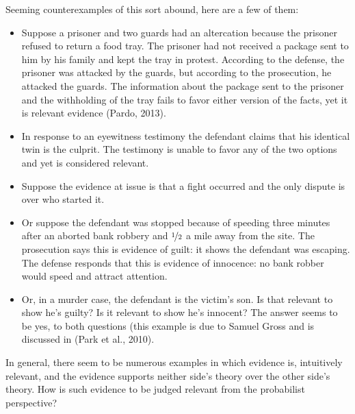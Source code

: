 \documentclass[10pt,dvipsnames,enabledeprecatedfontcommands]{scrartcl}
\begin{document}
\noindent  Seeming counterexamples of this sort abound, here are a few
of them:

\begin{itemize}
\item
  Suppose a prisoner and two guards had an altercation because the
  prisoner refused to return a food tray. The prisoner had not received
  a package sent to him by his family and kept the tray in protest.
  According to the defense, the prisoner was attacked by the guards, but
  according to the prosecution, he attacked the guards. The information
  about the package sent to the prisoner and the withholding of the tray
  fails to favor either version of the facts, yet it is relevant
  evidence (Pardo, 2013).
\item
  In response to an eyewitness testimony the defendant claims that his
  identical twin is the culprit. The testimony is unable to favor any of
  the two options and yet is considered relevant.
\item
  Suppose the evidence at issue is that a fight occurred and the only
  dispute is over who started it.
\item
  Or suppose the defendant was stopped because of speeding three minutes
  after an aborted bank robbery and \(\nicefrac{1}{2}\) a mile away from
  the site. The prosecution says this is evidence of guilt: it shows the
  defendant was escaping. The defense responds that this is evidence of
  innocence: no bank robber would speed and attract attention.
\item
  Or, in a murder case, the defendant is the victim's son. Is that
  relevant to show he's guilty? Is it relevant to show he's innocent?
  The answer seems to be yes, to both questions (this example is due to
  Samuel Gross and is discussed in (Park et al., 2010).
\end{itemize}

\noindent In general, there seem to be numerous examples in which
evidence is, intuitively relevant, and the evidence supports neither
side's theory over the other side's theory. How is such evidence to be
judged relevant from the probabilist perspective?
\end{document}
